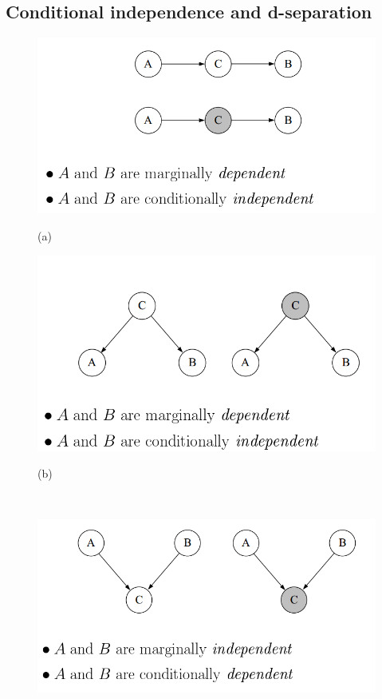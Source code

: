 \documentclass[11pt]{article}
\begin{document}
\subsection{Conditional independence and d-separation}
\begin{figure}
\begin{minipage}[t]{0.5\linewidth}
  \centering
  \centerline{\includegraphics[scale = 0.32]{cond_indep_1.png}}
  \vspace{-5pt}
  \centerline{(a)}
\end{minipage}
\begin{minipage}[t]{0.5\linewidth}
  \centering
  \centerline{\includegraphics[scale = 0.3]{cond_indep_2.png}}
  \vspace{-5pt}
  \centerline{(b)}
\end{minipage}\\
\begin{minipage}[t]{0.5\linewidth}
  \centering
  \centerline{\includegraphics[scale = 0.35]{cond_indep_3.png}}

\end{minipage}
\end{figure}
\end{document}
